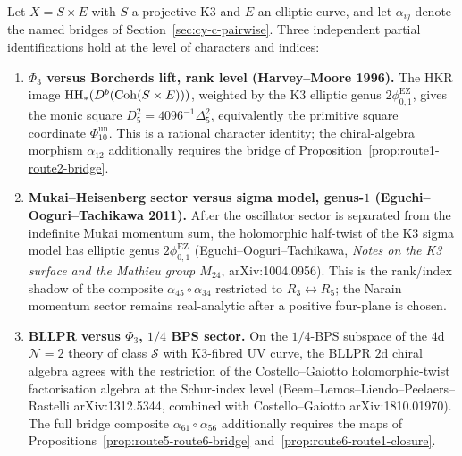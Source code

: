 \begin{proposition}
\label{prop:cy-c-pairwise-agreements}
Let $X = S \times E$ with $S$ a projective K3 and $E$ an elliptic curve, and let $\alpha_{ij}$ denote the named bridges of Section~\ref{sec:cy-c-pairwise}. Three independent partial identifications hold at the level of characters and indices:
\begin{enumerate}[label=\textup{(\alph*)}]
 \item \textbf{$\Phi_3$ versus Borcherds lift, rank level (Harvey--Moore 1996).} The HKR image $\mathrm{HH}_*(D^b(\mathrm{Coh}(S \times E)))$, weighted by the K3 elliptic genus \(2\phi_{0,1}^{\mathrm{EZ}}\), gives the monic square \(D_5^2=4096^{-1}\Delta_5^2\), equivalently the primitive square coordinate \(\Phi_{10}^{\mathrm{un}}\). This is a rational character identity; the chiral-algebra morphism $\alpha_{12}$ additionally requires the bridge of Proposition~\ref{prop:route1-route2-bridge}.
 \item \textbf{Mukai--Heisenberg sector versus sigma model, genus-$1$ (Eguchi--Ooguri--Tachikawa 2011).} After the oscillator sector is separated from the indefinite Mukai momentum sum, the holomorphic half-twist of the K3 sigma model has elliptic genus \(2\phi_{0,1}^{\mathrm{EZ}}\) (Eguchi--Ooguri--Tachikawa, \emph{Notes on the K3 surface and the Mathieu group $M_{24}$}, arXiv:1004.0956). This is the rank/index shadow of the composite $\alpha_{45} \circ \alpha_{34}$ restricted to $R_3 \leftrightarrow R_5$; the Narain momentum sector remains real-analytic after a positive four-plane is chosen.
 \item \textbf{BLLPR versus $\Phi_3$, $1/4$ BPS sector.} On the $1/4$-BPS subspace of the $4$d $\mathcal{N} = 2$ theory of class $\mathcal{S}$ with K3-fibred UV curve, the BLLPR $2$d chiral algebra agrees with the restriction of the Costello--Gaiotto holomorphic-twist factorisation algebra at the Schur-index level (Beem--Lemos--Liendo--Peelaers--Rastelli arXiv:1312.5344, combined with Costello--Gaiotto arXiv:1810.01970). The full bridge composite $\alpha_{61} \circ \alpha_{56}$ additionally requires the maps of Propositions~\ref{prop:route5-route6-bridge} and~\ref{prop:route6-route1-closure}.
\end{enumerate}
\end{proposition}

